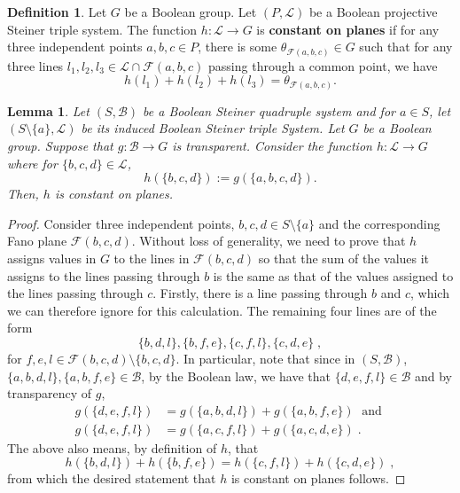 \documentclass{article}
\newtheorem{lemma}[theorem]{Lemma}
\theoremstyle{remark}
\theoremstyle{definition}
\newtheorem{definition}[theorem]{Definition}
\begin{document}
\begin{definition} Let $G$ be a Boolean group.
Let $(P, \mathcal{L})$ be a Boolean projective Steiner triple system. The function $h:\mathcal{L}\to G$ is \textbf{constant on planes} if for any three independent points $a,b,c\in P$, there is some $\theta_{\mathcal{F}(a,b,c)}\in G$ such that for any three lines $l_1, l_2, l_3\in\mathcal{L}\cap\mathcal{F}(a,b,c)$ passing through a common point, we have
\[h(l_1)+h(l_2)+h(l_3)=\theta_{\mathcal{F}(a,b,c)}.\]
\end{definition}

\begin{lemma}\label{lem:constonpl} Let $(S, \mathcal{B})$ be a Boolean Steiner quadruple system and for $a\in S$, let $(S\setminus\{a\}, \mathcal{L})$ be its induced Boolean Steiner triple System. Let $G$ be a Boolean group. Suppose that $g:\mathcal{B}\to G$ is transparent. Consider the function $h:\mathcal{L}\to G$ where for $\{b,c,d\}\in\mathcal{L}$, 
\[h(\{b,c,d\}):=g(\{a,b,c,d\}).\]
Then, $h$ is constant on planes. 
\end{lemma}
\begin{proof} Consider three independent points, $b,c,d\in S\setminus\{a\}$ and the corresponding Fano plane $\mathcal{F}(b,c,d)$. Without loss of generality, we need to prove that $h$ assigns values in $G$ to the lines in $\mathcal{F}(b,c,d)$ so that the sum of the values it assigns to the lines passing through $b$ is the same as that of the values assigned to the lines passing through $c$. Firstly, there is a line passing through $b$ and $c$, which we can therefore ignore for this calculation. The remaining four lines are of the form
\[\{b,d,l\},\{b,f, e\}, \{c,f, l\}, \{c, d, e\}\;,\]
    for $f,e,l\in \mathcal{F}(b,c,d)\setminus\{b,c,d\}$. In particular, note that since in $(S, \mathcal{B})$, $\{a, b,d,l\},\{a, b,f, e\}\in\mathcal{B}$, by the Boolean law, we have that $\{d, e, f, l\}\in\mathcal{B}$ and by transparency of $g$, 
    \begin{align*}
    g(\{d, e, f, l\}) & =g(\{a, b,d,l\})+g(\{a, b,f, e\})\; \text{ and } \\
    g(\{d, e, f, l\})&=g(\{a,c,f,l\})+ g(\{a, c, d, e\})\; .
\end{align*}
The above also means, by definition of $h$, that
\[h(\{b,d,l\})+h(\{b,f, e\})=h(\{c,f, l\})+h(\{c, d, e\})\; ,\]
from which the desired statement that $h$ is constant on planes follows.
\end{proof}
\end{document}
